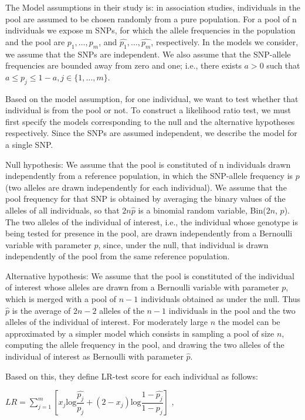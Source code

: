 \documentclass[12pt, singlespace]{article}
\begin{document}
The Model assumptions in their study is: in association studies, individuals in the pool are assumed
to be chosen randomly from a pure population. For a pool of n individuals we
expose m SNPs, for which the allele frequencies in the population and the pool
are $p_1,\dots,p_m$, and $\hat{p_1},\dots,\hat{p_m}$, respectively. In the models we consider, we assume that the SNPs are independent. We also assume that the SNP-allele frequencies are bounded away from zero and one; i.e., there exists $a>0$ such that $a\le p_j\le1-a, j\in\{1,\dots,m\}$.

Based on the model assumption, for one individual, we want to test whether that individual is from the pool or not. To construct a likelihood ratio test, we must first specify the models
corresponding to the null and the alternative hypotheses respectively. Since the
SNPs are assumed independent, we describe the model for a single SNP.

Null hypothesis: We assume that the pool is constituted of n individuals drawn
independently from a reference population, in which the SNP-allele frequency is $p$
(two alleles are drawn independently for each individual). We assume that the pool
frequency for that SNP is obtained by averaging the binary values of the alleles
of all individuals, so that $2n\hat{p}$ is a binomial random variable, Bin($2n$, $p$). The two
alleles of the individual of interest, i.e., the individual whose genotype is being
tested for presence in the pool, are drawn independently from a Bernoulli variable
with parameter $p$, since, under the null, that individual is drawn independently of
the pool from the same reference population.

Alternative hypothesis: We assume that the pool is constituted of the individual of
interest whose alleles are drawn from a Bernoulli variable with parameter $p$, which
is merged with a pool of $n-1$ individuals obtained as under the null. Thus $\hat{p}$ is the
average of $2n-2$ alleles of the $n-1$ individuals in the pool and the two alleles of the
individual of interest. For moderately large $n$ the model can be approximated by
a simpler model which consists in sampling a pool of size $n$, computing the allele
frequency in the pool, and drawing the two alleles of the individual of interest as
Bernoulli with parameter $\hat{p}$.

Based on this, they define LR-test score for each individual as follows:


$LR=\sum_{j=1}^{m}[x_j\mathrm{log}\dfrac{\hat{p_j}}{p_j} + (2-x_j)\mathrm{log}\dfrac{1-\hat{p_j}}{1-p_j}]$
, 
\end{document}
